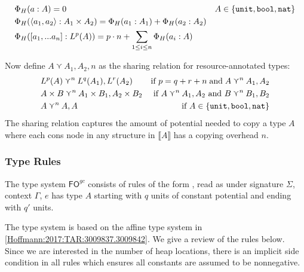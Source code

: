 \documentclass{easychair}
\newcommand{\ms}[1]{\ensuremath{\mathsf{#1}}}
\newcommand{\irl}[1]{\mathtt{#1}}
\newcounter{rule}
\newcommand{\fogc}{\ms{FO}^{gc}}
\theoremstyle{definition}
\begin{document}
\begin{align*}
&\Phi_H(a : A) = 0 &A \in \{\unittycst, \booltyabt, \irl{nat}\}\\
&\Phi_H(\pairexcst{a_1}{a_2} : \prodtycst{A_1}{A_2}) = \Phi_H(a_1 : A_1) + \Phi_H(a_2 : A_2)\\
&\Phi_H([a_1,...a_n] : L^p(A)) = p\cdot n + \sum_{1 \le i \le n} \Phi_H(a_i : A)  
\end{align*}

Now define $A \curlyvee A_1,A_2,n$ as the sharing relation for resource-annotated types:
\begin{align*}
	&L^p(A) \curlyvee^n L^q(A_1),L^r(A_2) & \text{if } p = q + r + n \;\text{and}\; 
			A \curlyvee^n A_1,A_2\\
	&\prodtycst{A}{B} \curlyvee^n \prodtycst{A_1}{B_1}, \prodtycst{A_2}{B_2}
		&\text{ if } A \curlyvee^n A_1,A_2 \text{ and } B \curlyvee^n B_1,B_2\\
	&A \curlyvee^n  A,A& \text{ if } A \in \{\unittycst, \booltycst, \irl{nat}\}\\
\end{align*}
The sharing relation captures the amount of potential needed to copy a type $A$ where each 
cons node in any structure in $\llbracket A \rrbracket$ has a copying overhead $n$.

\subsubsection{Type Rules}
\label{sect:typing}
The type system $\fogc$ consists of rules of the form , 
read as under signature $\Sigma$, context $\Gamma$, $e$ has type $A$ starting with $q$ units of 
constant potential and ending with $q'$ units.

The type system is based on the affine type system in \ref{Hoffmann:2017:TAR:3009837.3009842}. 
We give a review of the rules below.
Since we are interested in the number of heap locations, 
there is an implicit side condition in all rules
which ensures all constants are assumed to be nonnegative.
\end{document}
